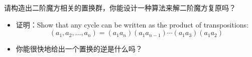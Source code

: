 \documentclass[a4paper, justified]{tufte-handout}
\begin{document}
\beginot
\begin{ot}[二阶魔方]
	请构造出二阶魔方相关的置换群，你能设计一种算法来解二阶魔方复原吗？
\end{ot}


\begin{ot}[transpositions]
	\begin{itemize}
		\item 	证明：Show that any cycle can be written as the product of transpositions:
		      $$(a_1,a_2,…,a_n)=(a_1 a_n)(a_1 a_{n−1} )⋯(a_1 a_3)(a_1 a_2)$$
		\item 你能很快地给出一个置换的逆是什么吗？
	\end{itemize}


\end{ot}




% 




\beginfb

% 
% 
\end{document}
